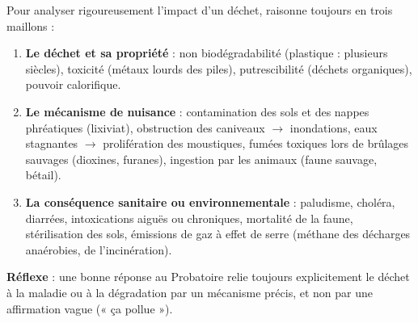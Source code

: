 \documentclass[11pt]{article}
\begin{document}
\begin{methode}
Pour analyser rigoureusement l'impact d'un déchet, raisonne toujours en trois maillons :
\begin{enumerate}
\item \textbf{Le déchet et sa propriété} : non biodégradabilité (plastique : plusieurs siècles), toxicité (métaux lourds des piles), putrescibilité (déchets organiques), pouvoir calorifique.
\item \textbf{Le mécanisme de nuisance} : contamination des sols et des nappes phréatiques (lixiviat), obstruction des caniveaux $\rightarrow$ inondations, eaux stagnantes $\rightarrow$ prolifération des moustiques, fumées toxiques lors de brûlages sauvages (dioxines, furanes), ingestion par les animaux (faune sauvage, bétail).
\item \textbf{La conséquence sanitaire ou environnementale} : paludisme, choléra, diarrées, intoxications aiguës ou chroniques, mortalité de la faune, stérilisation des sols, émissions de gaz à effet de serre (méthane  des décharges anaérobies,  de l'incinération).
\end{enumerate}
\textbf{Réflexe} : une bonne réponse au Probatoire relie toujours explicitement le déchet à la maladie ou à la dégradation par un mécanisme précis, et non par une affirmation vague (« ça pollue »).
\end{methode}
\end{document}
